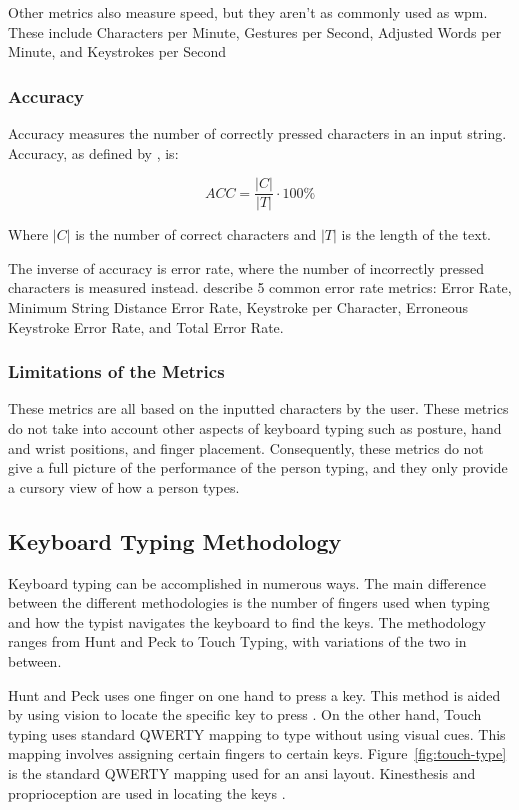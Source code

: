 \documentclass{report}
\newcommand{\labelequations}[1]{%
	\addcontentsline{equ}{equations}{\numberline{\theequation}#1}\par}
\begin{document}
Other metrics also measure speed, but they aren't as commonly used as \ac{wpm}.
These include Characters per Minute, Gestures per Second, Adjusted Words per
Minute, and Keystrokes per Second

\subsubsection{Accuracy}
Accuracy measures the number of correctly pressed characters in an input string.
Accuracy, as defined by \citeauthor{bartnik2021}, is:

\begin{equation}
	ACC = \frac{|C|}{|T|} \cdot 100\%
\end{equation}
\labelequations{Accuracy}

Where $|C|$ is the number of correct characters and $|T|$ is the length of the
text.

The inverse of accuracy is error rate, where the number of incorrectly pressed
characters is measured instead. \citeauthor{arif2009} describe 5 common error
rate metrics: Error Rate, Minimum String Distance Error Rate, Keystroke per
Character, Erroneous Keystroke Error Rate, and Total Error Rate.

\subsubsection{Limitations of the Metrics}
These metrics are all based on the inputted characters by the user. These
metrics do not take into account other aspects of keyboard typing such as
posture, hand and wrist positions, and finger placement. Consequently, these
metrics do not give a full picture of the performance of the person typing, and
they only provide a cursory view of how a person types.

\subsection{Keyboard Typing Methodology}
Keyboard typing can be accomplished in numerous ways. The main difference
between the different methodologies is the number of fingers used when typing
and how the typist navigates the keyboard to find the keys. The methodology
ranges from Hunt and Peck to Touch Typing, with variations of the two in
between.

Hunt and Peck uses one finger on one hand to press a key. This method is aided
by using vision to locate the specific key to press \parencite{hoot1986}. On the
other hand, Touch typing uses standard QWERTY mapping to type without using
visual cues. \parencite{dobson2009touch} This mapping involves assigning certain
fingers to certain keys. Figure~\ref{fig:touch-type} is the standard QWERTY
mapping used for an \ac{ansi} layout. Kinesthesis and proprioception are used in
locating the keys \parencite{logan2016}.
\end{document}
